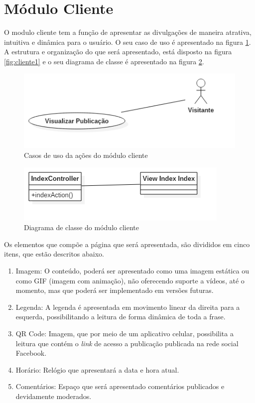 \section{Módulo Cliente}
O modulo cliente tem a função de apresentar as divulgações de maneira atrativa, intuitiva e dinâmica para o usuário. O seu caso de uso é apresentado na figura \ref{fig:casosDeUsoCliente}. A estrutura e organização do que será apresentado, está disposto na figura \ref{fig:cliente1} e o seu diagrama de classe é apresentado na figura \ref{fig:diagramaclasseCLIENTE}.

\begin{figure}[H]
\centering
\includegraphics[scale=0.6]{figuras/casosDeUsoCliente}
\caption{Casos de uso da ações do módulo cliente}
\label{fig:casosDeUsoCliente}
\end{figure} 

\begin{figure}[H]
\centering
\includegraphics[scale=0.4]{figuras/diagramaclasseCLIENTE}
\caption{Diagrama de classe do módulo cliente}
\label{fig:diagramaclasseCLIENTE}
\end{figure}

Os elementos que compõe a página que será apresentada, são divididos em cinco itens, que estão descritos abaixo.

\begin{enumerate}
   \item Imagem: O conteúdo, poderá ser apresentado como uma imagem estática ou como GIF (imagem com animação), não oferecendo suporte a vídeos, até o momento, mas que poderá ser implementado em versões futuras. 
   \item Legenda: A legenda é apresentada em movimento linear da direita para a esquerda, possibilitando a leitura de forma dinâmica de toda a frase.
   \item QR Code: Imagem, que por meio de um aplicativo celular, possibilita a leitura que contém o \textit{link} de acesso a publicação publicada na rede social Facebook.
   \item Horário: Relógio que apresentará a data e hora atual.  
   \item Comentários: Espaço que será apresentado comentários publicados e devidamente moderados.
 \end{enumerate}
  
